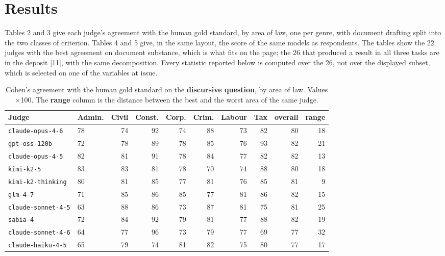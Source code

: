 \documentclass{IOS-Book-Article}
\begin{document}
\section{Results}

Tables 2 and 3 give each judge's agreement with the human gold standard, by area of law, one per genre, with document drafting split into the two classes of criterion. Tables 4 and 5 give, in the same layout, the score of the same models as respondents. The tables show the 22 judges with the best agreement on document substance, which is what fits on the page; the 26 that produced a result in all three tasks are in the deposit [11], with the same decomposition. Every statistic reported below is computed over the 26, not over the displayed subset, which is selected on one of the variables at issue.

\begin{table}[!ht]
\centering
\caption{Cohen's agreement with the human gold standard on the \textbf{discursive question}, by area of law. Values $\times$100. The \textbf{range} column is the distance between the best and the worst area of the same judge.}
\footnotesize\setlength{\tabcolsep}{2pt}
\begin{tabular}{llrrrrrrrr}
\hline
\textbf{Judge} & \textbf{Admin.} & \textbf{Civil} & \textbf{Const.} & \textbf{Corp.} & \textbf{Crim.} & \textbf{Labour} & \textbf{Tax} & \textbf{overall} & \textbf{range} \\
\hline
\texttt{claude-opus-4-6} & 78 & 74 & 92 & 74 & 88 & 73 & 82 & 80 & 18 \\
\texttt{gpt-oss-120b} & 72 & 78 & 89 & 78 & 85 & 76 & 93 & 82 & 21 \\
\texttt{claude-opus-4-5} & 82 & 81 & 91 & 78 & 84 & 77 & 82 & 82 & 13 \\
\texttt{kimi-k2-5} & 83 & 83 & 81 & 78 & 70 & 74 & 88 & 80 & 18 \\
\texttt{kimi-k2-thinking} & 80 & 81 & 85 & 77 & 81 & 76 & 85 & 81 & 9 \\
\texttt{glm-4-7} & 71 & 85 & 86 & 85 & 77 & 81 & 86 & 82 & 15 \\
\texttt{claude-sonnet-4-5} & 63 & 88 & 86 & 73 & 87 & 81 & 75 & 81 & 25 \\
\texttt{sabia-4} & 72 & 84 & 92 & 79 & 81 & 77 & 88 & 82 & 19 \\
\texttt{claude-sonnet-4-6} & 64 & 77 & 96 & 73 & 79 & 77 & 69 & 77 & 32 \\
\texttt{claude-haiku-4-5} & 65 & 79 & 74 & 81 & 82 & 75 & 80 & 77 & 17 \\

\end{tabular}
\end{table}
\end{document}

